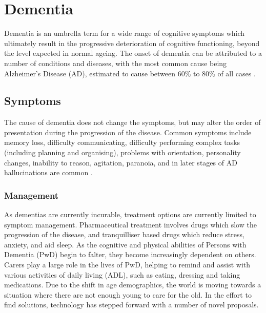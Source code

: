 \section{Dementia}
Dementia is an umbrella term for a wide range of cognitive symptoms which ultimately result in the progressive deterioration of cognitive functioning, beyond the level expected in normal ageing. The onset of dementia can be attributed to a number of conditions and diseases, with the most common cause being Alzheimer's Disease (AD), estimated to cause between 60\% to 80\% of all cases \cite{2015AlzheimersDiseaseFactsFigures}.  

\subsection{Symptoms}
The cause of dementia does not change the symptoms, but may alter the order of presentation during the progression of the disease. Common symptoms include memory loss, difficulty communicating, difficulty performing complex tasks (including planning and organising), problems with orientation, personality changes, inability to reason, agitation, paranoia, and in later stages of AD hallucinations are common \cite{NationalHealthService2015}.

\subsubsection{Management}
As dementias are currently incurable, treatment options are currently limited to symptom management. Pharmaceutical treatment involves drugs which slow the progression of the disease, and tranquilliser based drugs which reduce stress, anxiety, and aid sleep. As the cognitive and physical abilities of Persons with Dementia (PwD) begin to falter, they become increasingly dependent on others. 
Carers play a large role in the lives of PwD, helping to remind and assist with various activities of daily living (ADL), such as eating, dressing and taking medications. Due to the shift in age demographics, the world is moving towards a situation where there are not enough young to care for the old. In the effort to find solutions, technology has stepped forward with a number of novel proposals.

